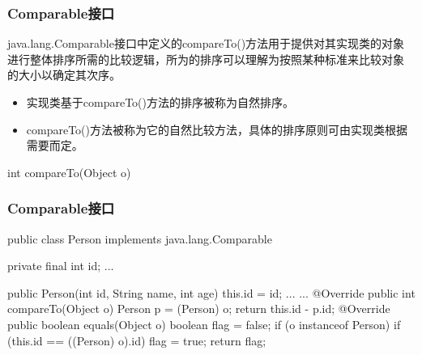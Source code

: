 \begin{frame}[fragile] %
  \frametitle{Comparable接口}

  java.lang.Comparable接口中定义的compareTo()方法用于提供对其实现类的对象
  进行整体排序所需的比较逻辑，所为的排序可以理解为按照某种标准来比较对象
  的大小以确定其次序。

  \begin{itemize}\kai
  \item 实现类基于compareTo()方法的排序被称为{\Blue 自然排序}。
  \item compareTo()方法被称为它的{\Blue 自然比较方法}，具体的排序原则可由实现类根据需要而定。
  \end{itemize}

  \begin{javaCode}
    int compareTo(Object o) {
      
    }   
  \end{javaCode}

  
\end{frame}

\begin{frame}[fragile] %
  \frametitle{Comparable接口}

  \begin{javaCode}
    public class Person implements java.lang.Comparable {
      private final int id;
      ...

      public Person(int id, String name, int age) {
        this.id = id;
        ...
      }
      ...
      @Override
      public int compareTo(Object o) {
        Person p = (Person) o;
        return this.id - p.id;
      }
      @Override
      public boolean equals(Object o) {
        boolean flag = false;
        if (o instanceof Person) {
          if (this.id == ((Person) o).id) {
            flag = true;
          }
        }
        return flag;
      }
    } 
  \end{javaCode}
\end{frame}

